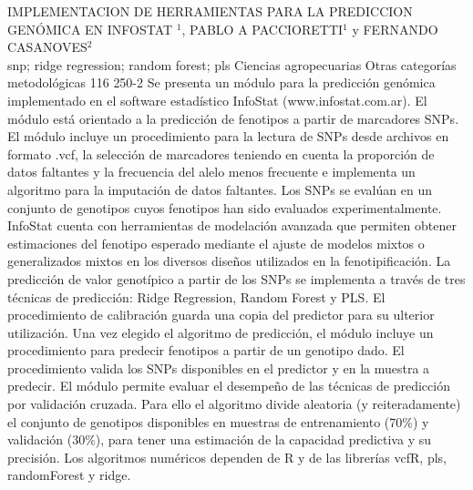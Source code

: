 \A
{IMPLEMENTACION DE HERRAMIENTAS PARA LA PREDICCION GENÓMICA EN INFOSTAT}
{$^1$, PABLO A PACCIORETTI$^1$ y FERNANDO CASANOVES$^2$}
{
\\}
{snp; ridge regression; random forest; pls} 
 {Ciencias agropecuarias} 
 {Otras categorías metodológicas} 
 {116} 
 {250-2}
{Se presenta un módulo para la predicción genómica implementado en el software estadístico InfoStat (www.infostat.com.ar). El módulo está orientado a la predicción de fenotipos a partir de marcadores SNPs. El módulo incluye un procedimiento para la lectura de SNPs desde archivos en formato .vcf, la selección de marcadores teniendo en cuenta la proporción de datos faltantes y la frecuencia del alelo menos frecuente e implementa un algoritmo para la imputación de datos faltantes. Los SNPs se evalúan en un conjunto de genotipos cuyos fenotipos han sido evaluados experimentalmente. InfoStat cuenta con herramientas de modelación avanzada que permiten obtener estimaciones del fenotipo esperado mediante el ajuste de modelos mixtos o generalizados mixtos en los diversos diseños utilizados en la fenotipificación. La predicción de valor genotípico a partir de los SNPs se implementa a través de tres técnicas de predicción: Ridge Regression, Random Forest y PLS. El procedimiento de calibración guarda una copia del predictor para su ulterior utilización. Una vez elegido el algoritmo de predicción, el módulo incluye un procedimiento para predecir fenotipos a partir de un genotipo dado. El procedimiento valida los SNPs disponibles en el predictor y en la muestra a predecir. El módulo permite evaluar el desempeño de las técnicas de predicción por validación cruzada. Para ello el algoritmo divide aleatoria (y reiteradamente) el conjunto de genotipos disponibles en muestras de entrenamiento (70\%) y validación (30\%), para tener una estimación de la capacidad predictiva y su precisión. Los algoritmos numéricos dependen de R y de las librerías vcfR, pls, randomForest y ridge.}
